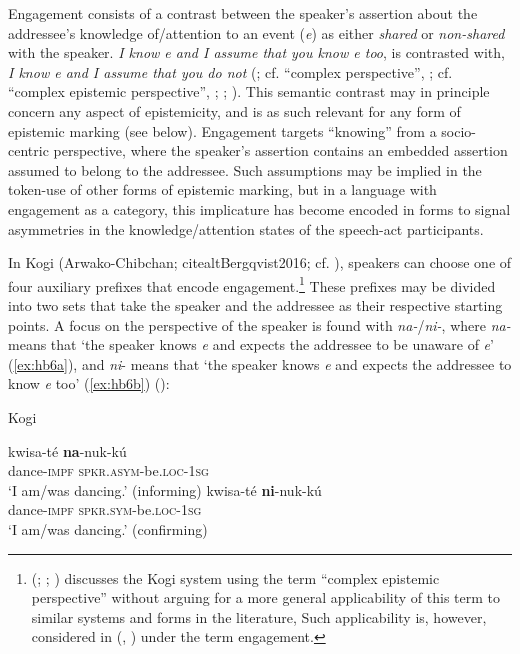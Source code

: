 \documentclass[output=paper]{langsci/langscibook}
\begin{document}
Engagement consists of a contrast between the speaker’s assertion about the addressee’s knowledge of/attention to an event (\textit{e}) as either \emph{shared} or \emph{non-shared} with the speaker. \emph{I know e and I assume that you know e too}, is contrasted with, \emph{I know e and I assume that you do not} (\citealt{Evansetal2017a}; cf. “complex perspective”, \citealt{Evans2005}; cf. “complex epistemic perspective”, \citealt{Bergqvist2015}; \citeyear{Bergqvist2016}; \citeyear{Bergqvist2017}). This semantic contrast may in principle concern any aspect of epistemicity, and is as such relevant for any form of epistemic marking (see below). Engagement targets “knowing” from a socio-centric perspective, where the speaker’s assertion contains an embedded assertion assumed to belong to the addressee. Such assumptions may be implied in the token-use of other forms of epistemic marking, but in a language with engagement as a category, this implicature has become encoded in forms to signal asymmetries in the knowledge/attention states of the speech-act participants.

In Kogi (Arwako-Chibchan; citealt{Bergqvist2016}; cf. \citealt{Ortiz1994}), speakers can choose one of four auxiliary prefixes that encode engagement.\footnote{\citeauthor{Bergqvist2015} (\citeyear{Bergqvist2015}; \citeyear{Bergqvist2016}; \citeyear{Bergqvist2017}) discusses the Kogi system using the term “complex epistemic perspective” without arguing for a more general applicability of this term to similar systems and forms in the literature, Such applicability is, however, considered in \citeauthor{Evansetal2017a} (\citeyear{Evansetal2017a}, \citeyear{Evansetal2017b}) under the term engagement.} 
These prefixes may be divided into two sets that take the speaker and the addressee as their respective starting points. A focus on the perspective of the speaker is found with \textit{na-}/\textit{ni-}, where \textit{na-} means that ‘the speaker knows \textit{e} and expects the addressee to be unaware of \textit{e}’ (\ref{ex:hb6a}), and \textit{ni}- means that ‘the speaker knows \textit{e} and expects the addressee to know \textit{e} too’ (\ref{ex:hb6b}) (\citealt[2]{Bergqvist2016}):

\begin{exe}
\ex Kogi\label{ex:hb6}
	\begin{xlist}
	\ex \label{ex:hb6a}
	\gll kwisa-té	\textbf{na}-nuk-kú\\
	dance-\textsc{impf}	\textsc{spkr}.\textsc{asym}-be.\textsc{loc}-1\textsc{sg}\\
	\trans ‘I am/was dancing.’ (informing) 
	\ex \label{ex:hb6b}
	\gll kwisa-té	\textbf{ni}-nuk-kú\\
	dance-\textsc{impf}	\textsc{spkr}.\textsc{sym}-be.\textsc{loc}-1\textsc{sg}\\
	\trans ‘I am/was dancing.’ (confirming)  
	\end{xlist}
\end{exe}
\end{document}
